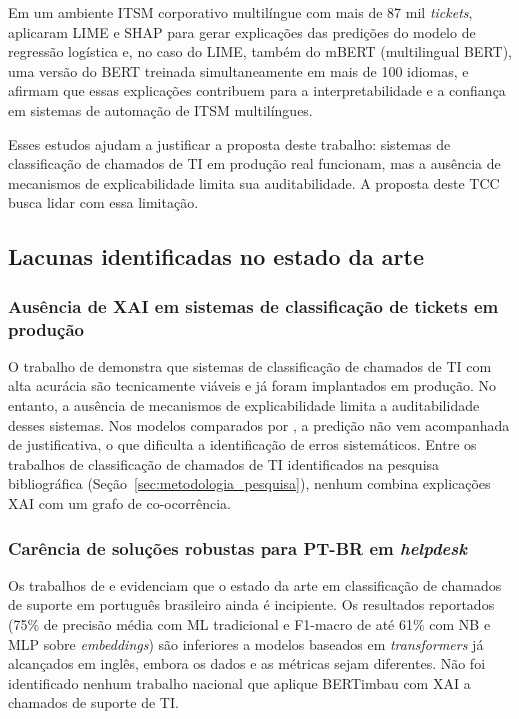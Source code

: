 \documentclass[
    12pt,                %
    openright,           %
    oneside,             %
    a4paper,             %
    english,             %
    brazil               %
]{abntex2}
\begin{document}
Em um ambiente ITSM corporativo multilíngue com mais de 87 mil \textit{tickets},  aplicaram LIME e 
SHAP para gerar explicações das predições do modelo de regressão logística e, no caso do LIME, 
também do mBERT (multilingual BERT), uma versão do BERT treinada simultaneamente 
em mais de 100 idiomas, e afirmam que essas explicações contribuem para a 
interpretabilidade e a confiança em sistemas de automação de ITSM multilíngues.

Esses estudos ajudam a justificar a proposta deste trabalho: sistemas de 
classificação de chamados de TI em produção real funcionam, mas a ausência 
de mecanismos de explicabilidade limita sua auditabilidade. 
A proposta deste TCC busca lidar com essa limitação.

\subsection{Lacunas identificadas no estado da arte}
\label{subsec:sintese_lacunas}

\subsubsection{Ausência de XAI em sistemas de classificação de tickets em produção}
\label{subsubsec:lacuna_xai}

O trabalho de  demonstra que sistemas de classificação de chamados de TI 
com alta acurácia são tecnicamente viáveis e já foram implantados em produção. No entanto, a 
ausência de mecanismos de explicabilidade limita a auditabilidade desses sistemas. 
Nos modelos comparados por , a predição não vem acompanhada de justificativa, o que dificulta a identificação de erros sistemáticos. Entre os trabalhos de classificação de chamados de TI identificados na pesquisa bibliográfica (Seção~\ref{sec:metodologia_pesquisa}), nenhum combina explicações XAI com um grafo de co-ocorrência.

\subsubsection{Carência de soluções robustas para PT-BR em \textit{helpdesk}}
\label{subsubsec:lacuna_ptbr}

Os trabalhos de  e  evidenciam 
que o estado da arte em classificação de chamados de suporte em português brasileiro 
ainda é incipiente. Os resultados reportados (75\% de precisão média com ML tradicional 
e F1-macro de até 61\% com NB e MLP sobre \textit{embeddings}) são inferiores a modelos 
baseados em \textit{transformers} já alcançados em inglês, embora os dados e as 
métricas sejam diferentes. Não foi identificado nenhum trabalho nacional que aplique 
BERTimbau com XAI a chamados de suporte de TI.
\end{document}
